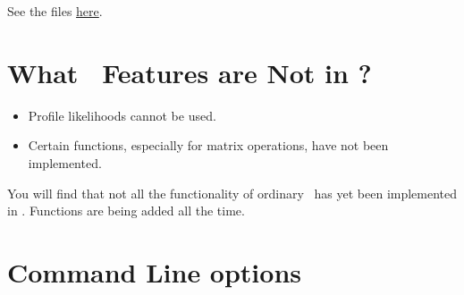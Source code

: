 \documentclass{admbmanual}
\begin{document}
See the files \href{http://admb-project.org/community/tutorials-and-examples/
random-effects-example-collection/item-response-theory-irt-and-the-multilevel-rasch-model-1}{here}.



\chapter{What \scAB\ Features are Not in \scAR?}

\begin{itemize}
\item Profile likelihoods cannot be used.
\item Certain functions, especially for matrix operations, have not been implemented.
\end{itemize}

You will find that not all the functionality of ordinary \scAB\ has yet been implemented 
in \scAR. Functions are being added all the time.


\chapter{Command Line options}
\label{sec:command_line_options}
\end{document}
